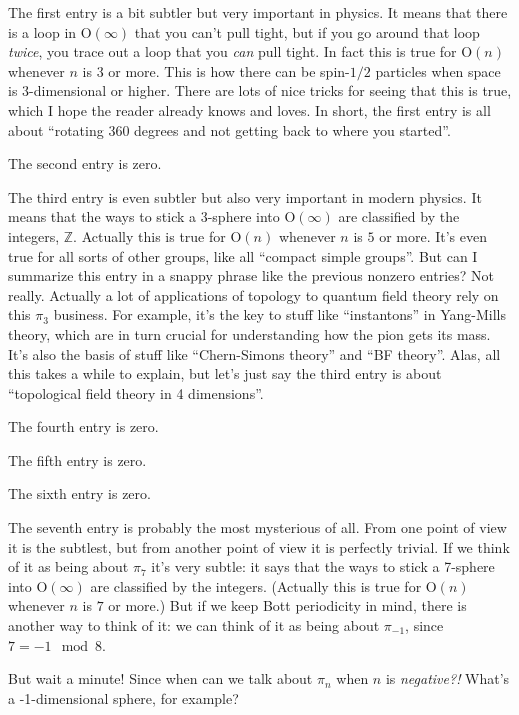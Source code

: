\documentclass{article}
\begin{document}
The first entry is a bit subtler but very important in physics. It means
that there is a loop in \(\mathrm{O}(\infty)\) that you can't pull
tight, but if you go around that loop \emph{twice}, you trace out a loop
that you \emph{can} pull tight. In fact this is true for
\(\mathrm{O}(n)\) whenever \(n\) is \(3\) or more. This is how there can
be spin-\(1/2\) particles when space is 3-dimensional or higher. There
are lots of nice tricks for seeing that this is true, which I hope the
reader already knows and loves. In short, the first entry is all about
``rotating 360 degrees and not getting back to where you started''.

The second entry is zero.

The third entry is even subtler but also very important in modern
physics. It means that the ways to stick a 3-sphere into
\(\mathrm{O}(\infty)\) are classified by the integers, \(\mathbb{Z}\).
Actually this is true for \(\mathrm{O}(n)\) whenever \(n\) is \(5\) or
more. It's even true for all sorts of other groups, like all ``compact
simple groups''. But can I summarize this entry in a snappy phrase like
the previous nonzero entries? Not really. Actually a lot of applications
of topology to quantum field theory rely on this \(\pi_3\) business. For
example, it's the key to stuff like ``instantons'' in Yang-Mills theory,
which are in turn crucial for understanding how the pion gets its mass.
It's also the basis of stuff like ``Chern-Simons theory'' and ``BF
theory''. Alas, all this takes a while to explain, but let's just say
the third entry is about ``topological field theory in 4 dimensions''.

The fourth entry is zero.

The fifth entry is zero.

The sixth entry is zero.

The seventh entry is probably the most mysterious of all. From one point
of view it is the subtlest, but from another point of view it is
perfectly trivial. If we think of it as being about \(\pi_7\) it's very
subtle: it says that the ways to stick a 7-sphere into
\(\mathrm{O}(\infty)\) are classified by the integers. (Actually this is
true for \(\mathrm{O}(n)\) whenever \(n\) is \(7\) or more.) But if we
keep Bott periodicity in mind, there is another way to think of it: we
can think of it as being about \(\pi_{-1}\), since \(7 = -1 \mod 8\).

But wait a minute! Since when can we talk about \(\pi_n\) when \(n\) is
\emph{negative?!} What's a -1-dimensional sphere, for example?
\end{document}
